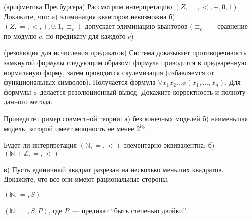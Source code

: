 \setcounter{curtask}{21}


\begin{task}(арифметика Пресбургера)
    Рассмотрим интерпретацию $(Z, =, <, +, 0, 1)$.
    Докажите, что:
    а) элиминация кванторов невозможна
    б) $(Z, =, <, +, 0, 1, \equiv_c)$ допускает элиминацию кванторов
    ($\equiv_c$~--- сравнение по модулю $c$, по предикату для каждого $c$)
\end{task}

\begin{task}(резолюция для исчисления предикатов)
    Система доказывает противоречивость замкнутой формулы следующим
    образом: формула приводится в предваренную нормальную форму, затем
    проводится скулемизация (избавляемся от функциональных
    символов). Получается формула $\forall x_1 x_2 \dots
    \phi(x_1, \dots, x_n)$. Для формулы $\phi$ делается резолюционный
    вывод. Докажите корректность и полноту данного метода.
\end{task}

\begin{task}
    Приведите пример совместной теории:
    а) без конечных моделей
    б) наименьшая модель, которой имеет мощность не менее $2^{\aleph_0}$
\end{task}

\breakline


\begin{ptask}{13}
    Будет ли интерпретация $(\mathbb{N}, =, <)$ элементарно
    эквивалентна:
    б) $(\mathbb{N} + \mathbb{Z}, =, <)$
\end{ptask}

\begin{ptask}{14}
    в) Пусть единичный квадрат разрезан на несколько меньших
    квадратов. Докажите, что все они имеют рациональные стороны.
\end{ptask}

\begin{ptask}{19}
    $(\mathbb{N}, =, S)$
\end{ptask}

\begin{ptask}{20}
    $(\mathbb{N}, =, S, P)$, где $P$~--- предикат ``быть степенью двойки''.
\end{ptask}